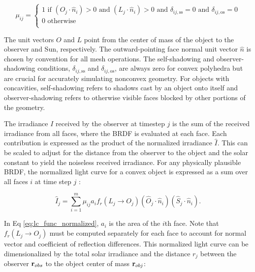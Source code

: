 \begin{equation} \label{eq:cvx_shadow_cond}
  \mu_{ij} = \begin{cases}
    1 \text{ if } \left( O_j \cdot \hat{n}_i \right) > 0 \text{ and } \left( L_j \cdot \hat{n}_i \right) > 0 
	  \text{ and } \delta_{ij,\text{ss}} = 0 \text{ and } \delta_{ij,\text{os}} = 0\\
    0 \text{ otherwise } \\
  \end{cases}
\end{equation}

The unit vectors $O$ and $L$ point from the center of mass of the object to the observer and Sun, respectively. The outward-pointing face normal unit vector $\hat{n}$ is chosen by convention for all mesh operations. 
The self-shadowing and observer-shadowing conditions, $\delta_{ij,\text{ss}}$ and $\delta_{ij,\text{os}}$, 
are always zero for convex polyhedra but are crucial for accurately simulating nonconvex geometry. 
For objects with concavities, self-shadowing refers to shadows cast by an object onto itself and observer-shadowing 
refers to otherwise visible faces blocked by other portions of the geometry.

The irradiance $I$ received by the observer at timestep $j$ is the sum of the received irradiance from all faces, where the BRDF is evaluated at each face. Each contribution is expressed as the product of the
normalized irradiance $\hat{I}$. This can be scaled to adjust for the distance from the observer to
the object and the solar constant to yield the noiseless received irradiance. For any physically plausible BRDF, the normalized light curve for a convex object is expressed as a sum over all faces $i$ at time step $j$ \cite{fan2020thesis}:

\begin{equation} \label{eq:lc_func_normalized}
  \hat{I}_{j} = \sum_{i=1}^{m}{\mu_{ij} a_i f_r(L_j \rightarrow O_j) \left( \hat{O}_j \cdot \hat{n}_i \right) \left( \hat{S}_j \cdot \hat{n}_i \right)}.
\end{equation}

In Eq \ref{eq:lc_func_normalized}, $a_i$ is the area of the $i$th face. Note that $f_r(L_j \rightarrow O_j)$ must be computed separately for each face to account for normal vector and coefficient of reflection differences. This normalized light curve can be dimensionalized by the total solar irradiance and the distance $r_j$ between the observer $\mathbf{r}_{obs}$ to the object center of mass $\mathbf{r}_{obj}$:

